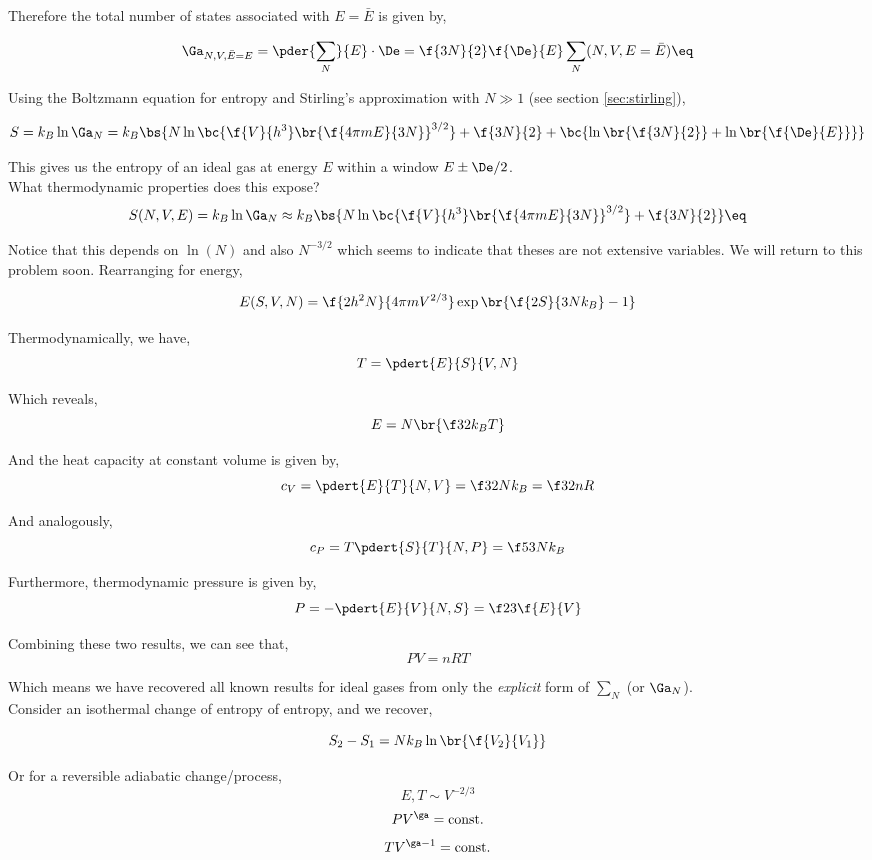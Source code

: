 \documentclass{article}
\begin{document}
Therefore the total number of states associated with $E= \bar{E}$ is given by,

\[ \Ga_{N, V, \bar{E} = E} = \pder{\sum_N}{E} \cdot \De = \f{3N}{2} \f{\De}{E} \sum_N(N, V, E =\bar{E}) \eq \label{eq:gahypershell}\]

Using the Boltzmann equation for entropy and Stirling's approximation with $N \gg 1$ (see section \ref{sec:stirling}),

\[ S = k_B \ln\Ga_N = k_B \bs{N \ln \bc{\f{V}{h^3} \br{\f{4\pi m E}{3N}}^{3/2}} + \f{3N}{2} + \bc{\ln \br{\f{3N}{2}} + \ln \br{\f{\De}{E}}}}  \]

This gives us the entropy of an ideal gas at energy $E$ within a window $E \pm \De /2$.\\

What thermodynamic properties does this expose?
\[ S(N,V,E) = k_B \ln\Ga_N \approx k_B \bs{N \ln \bc{\f{V}{h^3} \br{\f{4\pi m E}{3N}}^{3/2}} + \f{3N}{2}} \eq \label{eq:notextensive} \]

Notice that this depends on $\ln(N)$ and also $N^{-3/2}$ which seems to indicate that theses are not extensive variables. We will return to this problem soon. Rearranging for energy,

\[ E(S, V, N) = \f{2h^2N}{4 \pi m V^{2/3}} \exp\br{\f{2S}{3Nk_B} - 1} \]

Thermodynamically, we have,
\[ T = \pdert{E}{S}{V,N} \]

Which reveals,
\[ E = N \br{\f32 k_B T} \]

And the heat capacity at constant volume is given by,
\[ c_V = \pdert{E}{T}{N,V} = \f32 N k_B = \f32 nR \]

And analogously,
\[ c_P = T \pdert{S}{T}{N,P} = \f53 N k_B \]

Furthermore, thermodynamic pressure is given by,
\[ P = -\pdert{E}{V}{N,S} = \f23 \f{E}{V} \]

Combining these two results, we can see that,
\[ PV = nRT \]

Which means we have recovered all known results for ideal gases from only the \textit{explicit} form of $\sum_N$ (or $\Ga_N$).\\

Consider an isothermal change of entropy of entropy, and we recover,

\[ S_2 - S_1 = N k_B \ln\br{\f{V_2}{V_1}} \]

Or for a reversible adiabatic change/process,
\[ E,T \sim V^{-2/3} \]
\[ PV^\ga = \text{const.} \]
\[ TV^{\ga -1} = \text{const.} \]
\end{document}
